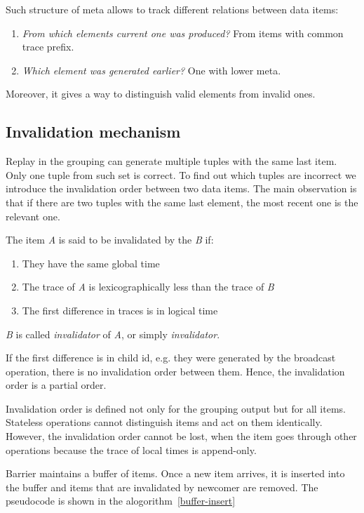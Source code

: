 Such structure of meta allows to track different relations between data items:

\begin{enumerate}
  \item{{\it From which elements current one was produced?} From items with common trace prefix.}
  \item{{\it Which element was generated earlier?} One with lower meta.}
\end{enumerate}

Moreover, it gives a way to distinguish valid elements from invalid ones.

\subsection{Invalidation mechanism}

Replay in the grouping can generate multiple tuples with the same last item. Only one tuple from such set is correct. To find out which tuples are incorrect we introduce the invalidation order between two data items. The main observation is that if there are two tuples with the same last element, the most recent one is the relevant one.

The item {\it A} is said to be invalidated by the {\it B} if:

\begin{enumerate}
\item They have the same global time
\item The trace of {\it A} is lexicographically less than the trace of {\it B}
\item The first difference in traces is in logical time
\end{enumerate}

{\it B} is called {\it invalidator} of {\it A}, or simply {\it invalidator}.

If the first difference is in child id, e.g. they were generated by the broadcast operation, there is no invalidation order between them. Hence, the invalidation order is a partial order. 

Invalidation order is defined not only for the grouping output but for all items. Stateless operations cannot distinguish items and act on them identically. However, the invalidation order cannot be lost, when the item goes through other operations because the trace of local times is append-only.

Barrier maintains a buffer of items. Once a new item arrives, it is inserted into the buffer and items that are invalidated by newcomer are removed. The pseudocode is shown in the alogorithm~\ref{buffer-insert}

